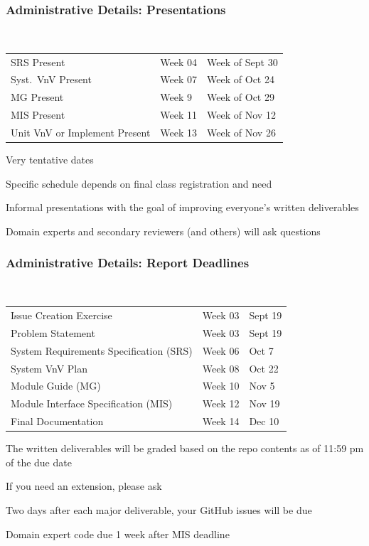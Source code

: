 \documentclass[t,12pt,numbers,fleqn]{beamer}
\begin{document}
\begin{frame}
\frametitle{Administrative Details: Presentations}

~\newline
\begin{tabular}{l l l}
SRS Present & Week 04 & Week of Sept 30\\
Syst.\ VnV Present & Week 07 & Week of Oct 24\\
MG Present & Week 9 & Week of Oct 29\\
MIS Present & Week 11 & Week of Nov 12\\
Unit VnV or Implement Present & Week 13 & Week of Nov 26\\
\end {tabular}

\bi
\item Very tentative dates
\item Specific schedule depends on final class registration and need
\item Informal presentations with the goal of improving everyone's written
  deliverables
\item Domain experts and secondary reviewers (and others) will ask questions
\ei

\end{frame}


\begin{frame}
\frametitle{Administrative Details: Report Deadlines}
~\newline
\begin{tabular}{l l l}
Issue Creation Exercise & Week 03 & Sept 19\\
Problem Statement & Week 03 & Sept 19\\
System Requirements Specification (SRS) & Week 06 & Oct 7\\
System VnV Plan & Week 08 & Oct 22\\
Module Guide (MG) & Week 10 & Nov 5\\
Module Interface Specification (MIS) & Week 12 & Nov 19\\
Final Documentation & Week 14 & Dec 10\\
\end {tabular}

\bi
\item The written deliverables will be graded based on the repo contents as of
11:59 pm of the due date
\item If you need an extension, please ask
\item Two days after each major deliverable, your GitHub issues will be due
\item Domain expert code due 1 week after MIS deadline
\ei

\end{frame}
\end{document}
